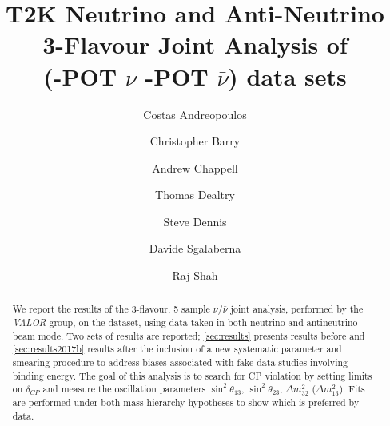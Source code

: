 %
%

\begin{frontmatter}
\title{
  T2K Neutrino and Anti-Neutrino 3-Flavour Joint Analysis of  \\
  \RunPeriod (\TotalPotNuRunOneEight-POT $\nu$  \TotalPotNuBarRunOneEight-POT $\bar{\nu}$)
  data sets
}
\author[RAL,LIV]  {Costas Andreopoulos}
\author[LIV]  {Christopher Barry}
\author[WAR]  {Andrew Chappell}
\author[LANCS]  {Thomas Dealtry}
\author[RAL,LIV]  {Steve Dennis\\}
\author[GEN]     {Davide Sgalaberna}
\author[RAL,OXF]  {Raj Shah}

\address[RAL]   {Science \& Technology Facilities Council (STFC), Rutherford Appleton Laboratory,\\ Harwell Oxford Campus, OX11 0QX, UK}
\address[LIV]   {University of Liverpool, Physics Department,\\ Liverpool, L69 7ZE, UK} 
\address[OXF]   {University of Oxford, Subdepartment of Particle Physics,\\ Oxford, OX1 3RH, UK}
\address[WAR]   {University of Warwick, Physics Department,\\ Coventry, CV4 7AL, UK}
\address[LANCS] {Lancaster University, Physics Department,\\ Lancaster, LA1 4YB, UK}
\address[GEN]  {University of Geneva, Departement de physique nucleaire et corpusculaire,\\ 1211 Geneve, Switzerland}

%
%

\begin{abstract}

We report the results of the 3-flavour, 5 sample $\nu/\bar{\nu}$ joint analysis, performed by the {\em VALOR} group, on the \RunPeriod dataset, using data taken in both neutrino and antineutrino beam mode. \color{blue}Two sets of results are reported; \cref{sec:results} presents results before and \cref{sec:results2017b} results after the inclusion of a new systematic parameter and smearing procedure to address biases associated with fake data studies involving binding energy\color{black}. The goal of this analysis is to search for CP violation by setting limits on $\delta_{CP}$ and measure the oscillation parameters $\sin^2 \theta_{13}$, $\sin^2 \theta_{23}$, $\Delta m^2_{32}$ ($\Delta m^2_{13}$). Fits are performed under both mass hierarchy hypotheses to show which is preferred by data.


\end{abstract}
\end{frontmatter}
